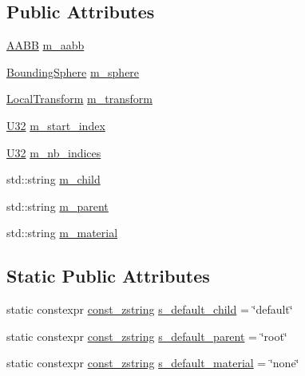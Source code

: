 \subsection*{Public Attributes}
\begin{DoxyCompactItemize}
\item 
\mbox{\hyperlink{classmage_1_1_a_a_b_b}{A\+A\+BB}} \mbox{\hyperlink{structmage_1_1rendering_1_1_model_part_a69f7f90a31e48a286fecebc9e680b5ef}{m\+\_\+aabb}}
\item 
\mbox{\hyperlink{classmage_1_1_bounding_sphere}{Bounding\+Sphere}} \mbox{\hyperlink{structmage_1_1rendering_1_1_model_part_aa2204e02fe90f993990cdda677bff6e7}{m\+\_\+sphere}}
\item 
\mbox{\hyperlink{classmage_1_1_local_transform}{Local\+Transform}} \mbox{\hyperlink{structmage_1_1rendering_1_1_model_part_af34853cb09b179bd8ffb0da151914066}{m\+\_\+transform}}
\item 
\mbox{\hyperlink{namespacemage_a41c104c036fba3756a74e19f793eeaa1}{U32}} \mbox{\hyperlink{structmage_1_1rendering_1_1_model_part_a251d19417a0b4abe98faeae767b9fef4}{m\+\_\+start\+\_\+index}}
\item 
\mbox{\hyperlink{namespacemage_a41c104c036fba3756a74e19f793eeaa1}{U32}} \mbox{\hyperlink{structmage_1_1rendering_1_1_model_part_a6e622f4bcb1ada388c3ee489c22e4547}{m\+\_\+nb\+\_\+indices}}
\item 
std\+::string \mbox{\hyperlink{structmage_1_1rendering_1_1_model_part_ad62194df918560d18de5e311b26eabfc}{m\+\_\+child}}
\item 
std\+::string \mbox{\hyperlink{structmage_1_1rendering_1_1_model_part_ac2e8e1a53ded91cf4e0439c15b63ab07}{m\+\_\+parent}}
\item 
std\+::string \mbox{\hyperlink{structmage_1_1rendering_1_1_model_part_abe5c6a98f2c039f2a20e9f6d1842f71b}{m\+\_\+material}}
\end{DoxyCompactItemize}
\subsection*{Static Public Attributes}
\begin{DoxyCompactItemize}
\item 
static constexpr \mbox{\hyperlink{namespacemage_abfd9206dc607ceb5d13ec68bf075a5c0}{const\+\_\+zstring}} \mbox{\hyperlink{structmage_1_1rendering_1_1_model_part_a3571b142c7948d7ab5af699799c69b42}{s\+\_\+default\+\_\+child}} = \char`\"{}default\char`\"{}
\item 
static constexpr \mbox{\hyperlink{namespacemage_abfd9206dc607ceb5d13ec68bf075a5c0}{const\+\_\+zstring}} \mbox{\hyperlink{structmage_1_1rendering_1_1_model_part_ab6747ba3fd20c9f55f1d9bb7a64033e5}{s\+\_\+default\+\_\+parent}} = \char`\"{}root\char`\"{}
\item 
static constexpr \mbox{\hyperlink{namespacemage_abfd9206dc607ceb5d13ec68bf075a5c0}{const\+\_\+zstring}} \mbox{\hyperlink{structmage_1_1rendering_1_1_model_part_a833762db3fb81dd2086e9b89da158b12}{s\+\_\+default\+\_\+material}} = \char`\"{}none\char`\"{}
\end{DoxyCompactItemize}


